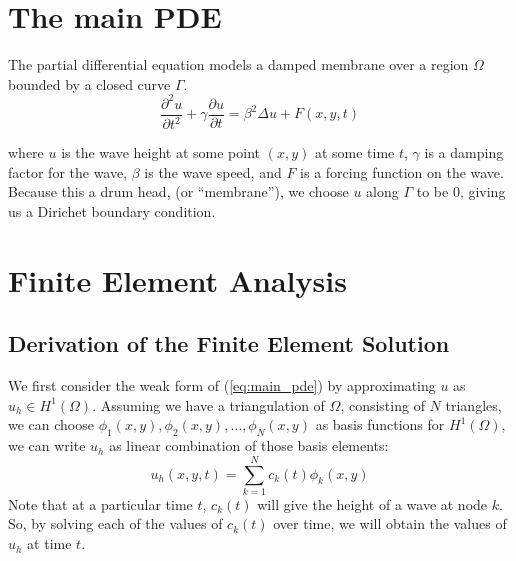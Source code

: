 \documentclass[a4paper,12pt]{article}
\begin{document}
\newcommand{\innerproduct}[2]{\int\limits_{\Omega} #1 #2 d\Omega}
\newcommand{\innerproductdot}[2]{\int\limits_{\Omega} \nabla #1 \cdot \nabla #2 d\Omega}
\newcommand{\firstderivative}[2]{\frac{d #1}{d #2}}
\newcommand{\secondderivative}[2]{\frac{d^2 #1}{d #2^2}}
\newcommand{\firstpartial}[2]{\frac{\partial #1}{\partial #2}}
\newcommand{\secondpartial}[2]{\frac{\partial^2 #1}{\partial #2^2}}
\newcommand{\laplacian}[1]{\Delta #1}
\newcommand{\secondfinitediff}[1]{\frac{#1^{n+1} - 2#1^n + #1^{n-1}}{\delta t^2}}
\newcommand{\firstfinitediff}[1]{\frac{#1^{n+1} - #1^{n-1}}{2\delta t}}
\newcommand{\step}[1]{\left( \frac{1}{\delta t^2} #1 \frac{\gamma}{2\delta t} \right)}
\newcommand{\mat}[2][rrrr]{
    \left(\begin{array}{#1}
    #2 \\
    \end{array}
    \right)
}

\section{The main PDE}
The partial differential equation models a damped membrane over a region $\Omega$ bounded by a closed curve $\Gamma$.
\begin{equation} \label{eq:main_pde}
\secondpartial{u}{t} + \gamma \firstpartial{u}{t}
=
\beta^2 \laplacian{u} + F(x,y,t)
\end{equation}

where $u$ is the wave height at some point $(x,y)$ at some time $t$, $\gamma$ is a damping factor for the wave,
$\beta$ is the wave speed, and $F$ is a forcing function on the wave. Because this a drum head, (or ``membrane''), we choose
$u$ along $\Gamma$ to be 0, giving us a Dirichet boundary condition.

\section{Finite Element Analysis}
\subsection{Derivation of the Finite Element Solution}
We first consider the weak form of (\ref{eq:main_pde}) by approximating $u$ as $u_h \in H^1(\Omega)$. Assuming we have
a triangulation of $\Omega$, consisting of $N$ triangles, we can choose 
$\phi_1(x,y), \phi_2(x,y), \ldots, \phi_N(x,y)$ as basis functions for $H^1(\Omega)$, we can write $u_h$ as linear
combination of those basis elements:
\begin{equation} \label{eq:u_h}
u_h(x,y,t) = \sum\limits_{k=1}^N c_k(t) \phi_k(x,y)
\end{equation}
Note that at a particular time $t$, $c_k(t)$ will give the height of a wave at node $k$. So, by solving each of the values
of $c_k(t)$ over time, we will obtain the values of $u_h$ at time $t$.
\end{document}
